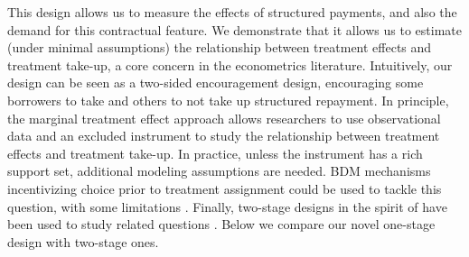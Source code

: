 \documentclass[12pt, a4paper]{article}
\begin{document}
This design allows us to measure the effects of structured payments, and also the demand for this contractual feature. We demonstrate that it allows us to estimate (under minimal assumptions) the relationship between treatment effects and treatment take-up, a core concern in the econometrics literature. Intuitively, our design can be seen as a two-sided encouragement design, encouraging some borrowers to take and others to not take up structured repayment. In principle, the marginal treatment effect approach allows researchers to use observational data and an excluded instrument to study the relationship between treatment effects and treatment take-up. In practice, unless the instrument has a rich support set, additional modeling assumptions \citep{mogstad2018using} are needed. BDM mechanisms incentivizing choice prior to treatment assignment \citep{becker1964measuring} could be used to tackle this question, with some limitations \citep{bohm1997eliciting,banerji2014detection}. Finally, two-stage designs in the spirit of \cite{KarlanZinman2009} have been used to study related questions \citep{Beaman2023}. Below we compare our novel one-stage design with two-stage ones.

\end{document}
